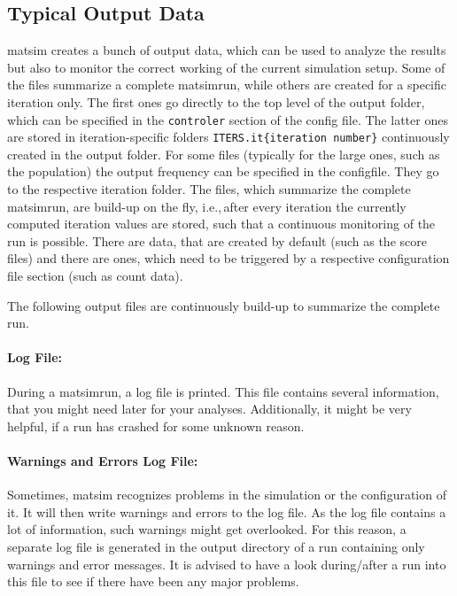 \subsection{Typical Output Data}
\label{sec:outputdata}
\gls{matsim} creates a bunch of output data, which can be used to analyze the results but also to monitor the correct working of the current simulation setup. Some of the files summarize a complete \gls{matsimrun}, while others are created for a specific \gls{iteration} only. The first ones go directly to the top level of the output folder, which can be specified in the \lstinline|controler| section of the config file. The latter ones are stored in iteration-specific folders \lstinline|ITERS.it{iteration number}| continuously created in the output folder. For some files (typically for the large ones, such as the population) the output frequency can be specified in the \gls{configfile}. They go to the respective iteration folder. The files, which summarize the complete \gls{matsimrun}, are build-up on the fly, i.e.,\,after every iteration the currently computed iteration values are stored, such that a continuous monitoring of the run is possible. There are data, that are created by default (such as the score files) and there are ones, which need to be triggered by a respective configuration file section (such as count data).


The following output files are continuously build-up to summarize the complete run.

\paragraph{Log File:}
During a \gls{matsimrun}, a log file is printed. This file contains several information, that you might need later for your analyses. Additionally, it might be very helpful, if a run has crashed for some unknown reason. 

\paragraph{Warnings and Errors Log File:}
Sometimes, \gls{matsim} recognizes problems in the simulation or the configuration of it. It will then write warnings and errors to the log file. As the log file contains a lot of information, such warnings might get overlooked. For this reason, a separate log file is generated in the output directory of a run containing only warnings and error messages. It is advised to have a look during/after a run into this file to see if there have been any major problems.

